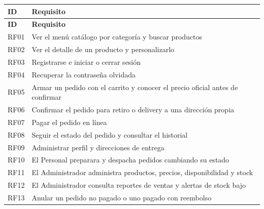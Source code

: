 \documentclass[10pt,letterpaper]{article}
\begin{document}
{\footnotesize
\begin{longtable}{|P{\tabcolsep\relax}|P{\tabcolsep\relax}|}
\hline
\textbf{ID} & \textbf{Requisito} \\ \hline
\endfirsthead
\hline
\textbf{ID} & \textbf{Requisito} \\ \hline
\endhead
RF01 & Ver el menú catálogo por categoría y buscar productos \\ \hline
RF02 & Ver el detalle de un producto y personalizarlo  \\ \hline
RF03 & Registrarse e iniciar o cerrar sesión \\ \hline
RF04 & Recuperar la contraseña olvidada \\ \hline
RF05 & Armar un pedido con el carrito y conocer el precio oficial antes de confirmar \\ \hline
RF06 & Confirmar el pedido para retiro o delivery a una dirección propia \\ \hline
RF07 & Pagar el pedido en línea \\ \hline
RF08 & Seguir el estado del pedido y consultar el historial \\ \hline
RF09 & Administrar perfil y direcciones de entrega \\ \hline
RF10 & El Personal preparara y despacha pedidos cambiando su estado \\ \hline
RF11 & El Administrador administra productos, precios, disponibilidad y stock \\ \hline
RF12 & El Administrador consulta reportes de ventas y alertas de stock bajo \\ \hline
RF13 & Anular un pedido no pagado o uno pagado con reembolso \\ \hline
\end{longtable}}
\end{document}
